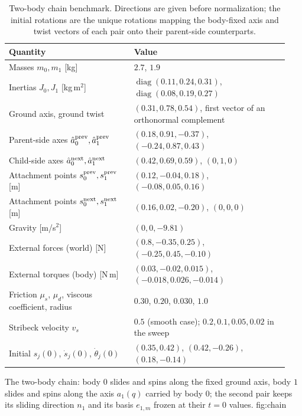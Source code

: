 \begin{table}[!htb]
\centering
\caption{Two-body chain benchmark. Directions are given before normalization; the initial rotations
are the unique rotations mapping the body-fixed axis and twist vectors of each pair onto their
parent-side counterparts.}
\label{tab:chain}
\small
\begin{tabular}{P{0.42\linewidth}P{0.52\linewidth}}
\toprule
Quantity & Value \\
\midrule
Masses $m_0,m_1$ [kg] & $2.7$, $1.9$ \\
Inertias $J_0,J_1$ [kg\,m$^2$] & $\operatorname{diag}(0.11,0.24,0.31)$, $\operatorname{diag}(0.08,0.19,0.27)$ \\
Ground axis, ground twist & $(0.31,0.78,0.54)$, first vector of an orthonormal complement \\
Parent-side axes $\hat a^{\rm prev}_0,\hat a^{\rm prev}_1$ & $(0.18,0.91,-0.37)$, $(-0.24,0.87,0.43)$ \\
Child-side axes $\hat a^{\rm next}_0,\hat a^{\rm next}_1$ & $(0.42,0.69,0.59)$, $(0,1,0)$ \\
Attachment points $s^{\rm prev}_0,s^{\rm prev}_1$ [m] & $(0.12,-0.04,0.18)$, $(-0.08,0.05,0.16)$ \\
Attachment points $s^{\rm next}_0,s^{\rm next}_1$ [m] & $(0.16,0.02,-0.20)$, $(0,0,0)$ \\
Gravity [m/s$^2$] & $(0,0,-9.81)$ \\
External forces (world) [N] & $(0.8,-0.35,0.25)$, $(-0.25,0.45,-0.10)$ \\
External torques (body) [N\,m] & $(0.03,-0.02,0.015)$, $(-0.018,0.026,-0.014)$ \\
Friction $\mu_s$, $\mu_d$, viscous coefficient, radius & $0.30$, $0.20$, $0.030$, $1.0$ \\
Stribeck velocity $v_s$ & $0.5$ (smooth case); $0.2,0.1,0.05,0.02$ in the sweep \\
Initial $s_j(0)$, $\dot s_j(0)$, $\dot\theta_j(0)$ & $(0.35,0.42)$, $(0.42,-0.26)$, $(0.18,-0.14)$ \\
\bottomrule
\end{tabular}
\end{table}

{The two-body chain: body $0$ slides and spins along the fixed ground axis, body $1$ slides and spins
along the axis $a_1(q)$ carried by body $0$; the second pair keeps its sliding direction $n_1$ and
its basis $e_{1,m}$ frozen at their $t=0$ values.}
{fig:chain}


